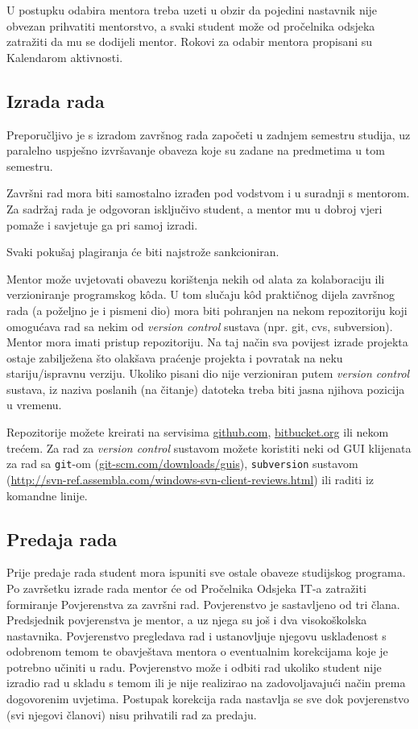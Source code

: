 U postupku odabira mentora treba uzeti u obzir da pojedini nastavnik nije obvezan prihvatiti mentorstvo, a svaki student može od pročelnika odsjeka zatražiti da mu se dodijeli mentor. Rokovi za odabir mentora propisani su Kalendarom aktivnosti.

\subsection{Izrada rada}
Preporučljivo je s izradom završnog rada započeti u zadnjem semestru studija, uz paralelno uspješno izvršavanje obaveza koje su zadane na predmetima u tom semestru.

Završni rad mora biti samostalno izrađen pod vodstvom i u suradnji s mentorom. Za sadržaj rada je odgovoran isključivo student, a mentor mu u dobroj vjeri pomaže i savjetuje ga pri samoj izradi.

Svaki pokušaj plagiranja će biti najstrože sankcioniran.

Mentor može uvjetovati obavezu korištenja nekih od alata za kolaboraciju ili verzioniranje programskog k\^oda. U tom slučaju k\^od praktičnog dijela završnog rada (a poželjno je i pismeni dio) mora biti pohranjen na nekom repozitoriju koji omogućava rad sa nekim od \textit{version control} sustava (npr. git, cvs, subversion). Mentor mora imati pristup repozitoriju. Na taj način sva povijest izrade projekta ostaje zabilježena što olakšava praćenje projekta i povratak na neku stariju/ispravnu verziju. Ukoliko pisani dio nije verzioniran putem \textit{version control} sustava, iz naziva poslanih (na čitanje) datoteka treba biti jasna njihova pozicija u vremenu.  
 
Repozitorije možete kreirati na servisima \url{github.com}, \url{bitbucket.org} ili nekom trećem. Za rad za \textit{version control} sustavom možete koristiti neki od GUI klijenata za rad sa 
 \texttt{git}-om (\url{git-scm.com/downloads/guis}), \texttt{subversion} sustavom (\url{http://svn-ref.assembla.com/windows-svn-client-reviews.html}) ili raditi iz komandne linije.
 
\subsection{Predaja rada}
Prije predaje rada student mora ispuniti sve ostale obaveze studijskog programa. Po završetku izrade rada mentor će od Pročelnika Odsjeka IT-a zatražiti formiranje Povjerenstva za završni rad. Povjerenstvo je sastavljeno od tri člana. Predsjednik povjerenstva je mentor, a uz njega su još i dva visokoškolska nastavnika. Povjerenstvo pregledava rad i ustanovljuje njegovu usklađenost s odobrenom temom te obavještava mentora o eventualnim korekcijama koje je potrebno učiniti u radu. Povjerenstvo može i odbiti rad ukoliko student nije izradio rad u skladu s temom ili je nije realizirao na zadovoljavajući način prema dogovorenim uvjetima. Postupak korekcija rada nastavlja se sve dok povjerenstvo (svi njegovi članovi) nisu prihvatili rad za predaju. 

